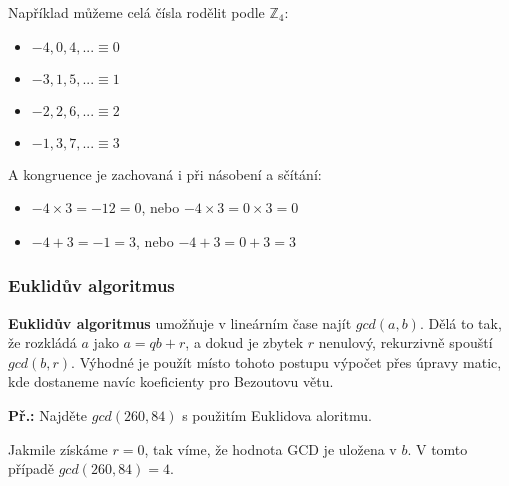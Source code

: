 \documentclass[10pt,a4paper]{article}
\begin{document}
Například můžeme celá čísla rodělit podle $\mathbb{Z}_4$:
\begin{itemize}
\item ${-4, 0, 4, ...} \equiv  0$
\item ${-3, 1, 5, ...} \equiv  1$
\item ${-2, 2, 6, ...} \equiv  2$
\item ${-1, 3, 7, ...} \equiv  3$
\end{itemize}

A kongruence je zachovaná i při násobení a sčítání:

\begin{itemize}
\item $-4 \times 3 = -12 = 0$, nebo $-4 \times 3 = 0 \times 3 = 0$ 
\item $-4 + 3 = -1 = 3$, nebo $-4 + 3 = 0 + 3 = 3$ 
\end{itemize}

\subsubsection{Euklidův algoritmus}
\textbf{Euklidův algoritmus} umožňuje v lineárním čase najít $gcd(a,b)$. Dělá to
tak, že rozkládá $a$ jako $a = qb + r$, a dokud je zbytek $r$ nenulový,
rekurzivně spouští $gcd(b,r)$. Výhodné je použít místo tohoto postupu výpočet
přes úpravy matic, kde dostaneme navíc koeficienty pro Bezoutovu větu.

\begin{exercise}

\textbf{Př.:} Najděte $gcd(260, 84)$ s použitím Euklidova aloritmu.

\begin{center}
\end{center}

Jakmile získáme $r = 0$, tak víme, že hodnota GCD je uložena v $b$. V tomto
případě $gcd(260, 84) = 4$.

\end{exercise}
\end{document}
